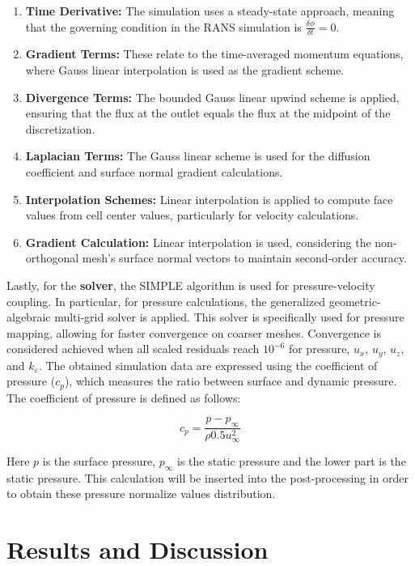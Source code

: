 \documentclass[12pt,a4paper]{cibb}
\begin{document}
\begin{enumerate}
    \item \textbf{Time Derivative:} The simulation uses a steady-state approach, meaning that the governing condition in the RANS simulation is $\frac{\delta \phi}{\delta t}=0$.  
    \item \textbf{Gradient Terms:} These relate to the time-averaged momentum equations, where Gauss linear interpolation is used as the gradient scheme.  
    \item \textbf{Divergence Terms:} The bounded Gauss linear upwind scheme is applied, ensuring that the flux at the outlet equals the flux at the midpoint of the discretization.  
    \item \textbf{Laplacian Terms:} The Gauss linear scheme is used for the diffusion coefficient and surface normal gradient calculations.  
    \item \textbf{Interpolation Schemes:} Linear interpolation is applied to compute face values from cell center values, particularly for velocity calculations.  
    \item \textbf{Gradient Calculation:} Linear interpolation is used, considering the non-orthogonal mesh's surface normal vectors to maintain second-order accuracy.  
\end{enumerate}

Lastly, for the \textbf{solver}, the SIMPLE algorithm is used for pressure-velocity coupling. In particular, for pressure calculations, the generalized geometric-algebraic multi-grid solver is applied. This solver is specifically used for pressure mapping, allowing for faster convergence on coarser meshes. Convergence is considered achieved when all scaled residuals reach $10^{-6}$ for pressure, $u_x$, $u_y$, $u_z$, and $k_{\varepsilon}$.  
The obtained simulation data are expressed using the coefficient of pressure ($c_p$), which measures the ratio between surface and dynamic pressure. The coefficient of pressure is defined as follows:


\begin{equation}
    c_p = \frac{p - p_\infty}{\rho 0.5 u_\infty^2}
\end{equation}


Here $p$ is the surface pressure, $p_\infty$ is the static pressure and the lower part is the static pressure. This calculation will be inserted into the post-processing in order to obtain these pressure normalize values distribution. 



\section{\bf Results and Discussion}
\label{sec:RESULTS}
\end{document}
